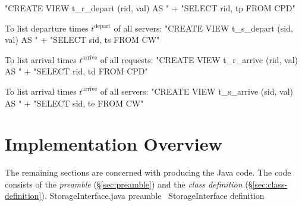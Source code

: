 \documentclass{article}
\def\nwendcode{\endtrivlist \endgroup}
\let\nwdocspar=\par
\theoremstyle{definition}
\begin{document}
\nwenddocs{}\endmoddef{}
"CREATE VIEW t_r_depart (rid, val) AS "
  + "SELECT rid, tp FROM CPD"
\nwendcode{}\nwdocspar
To list departure times $t^\textrm{depart}$ of all servers:
\nwenddocs{}\endmoddef{}
"CREATE VIEW t_s_depart (sid, val) AS "
  + "SELECT sid, ts FROM CW"
\nwendcode{}\nwdocspar
To list arrival times $t^\textrm{arrive}$ of all requests:
\nwenddocs{}\endmoddef{}
"CREATE VIEW t_r_arrive (rid, val) AS "
  + "SELECT rid, td FROM CPD"
\nwendcode{}\nwdocspar
To list arrival times $t^\textrm{arrive}$ of all servers:
\nwenddocs{}\endmoddef{}
"CREATE VIEW t_s_arrive (sid, val) AS "
  + "SELECT sid, te FROM CW"
\nwendcode{}\nwdocspar

\section{Implementation Overview}
\label{sec:implementation-overview}
The remaining sections are concerned with producing the Java code.  The code
consists of the \emph{preamble} (\S\ref{sec:preamble}) and the \emph{class
definition} (\S\ref{sec:class-definition}).
\nwenddocs{}\endmoddef{}
  \LA{}StorageInterface.java preamble~{\nwtagstyle{}}\RA{}
  \LA{}\code{}StorageInterface\edoc{} definition~{\nwtagstyle{}}\RA{}
\nwendcode{}\nwdocspar
\end{document}
